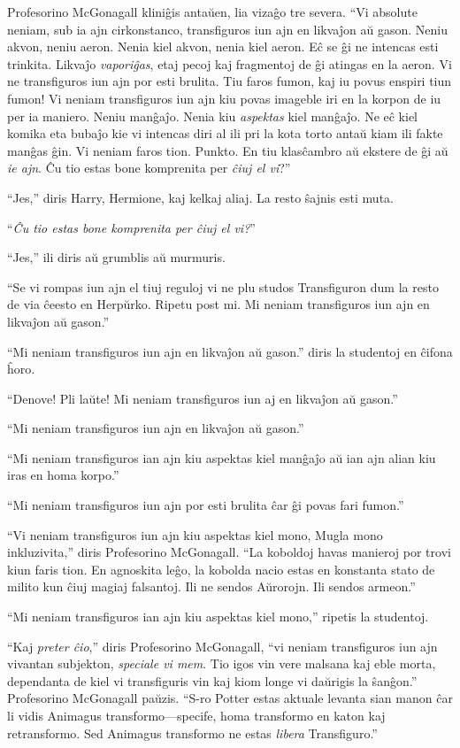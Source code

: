 Profesorino McGonagall kliniĝis antaŭen, lia vizaĝo tre severa. ``Vi
absolute neniam, sub ia ajn cirkonstanco, transfiguros iun ajn en
likvaĵon aŭ gason. Neniu akvon, neniu aeron. Nenia kiel akvon, nenia
kiel aeron. Eĉ se ĝi ne intencas esti trinkita. Likvaĵo
\emph{vaporiĝas}, etaj pecoj kaj fragmentoj de ĝi atingas en la
aeron. Vi ne transfiguros iun ajn por esti brulita. Tiu faros fumon,
kaj iu povus enspiri tiun fumon! Vi neniam transfiguros iun ajn kiu
povas imageble iri en la korpon de iu per ia maniero. Neniu
manĝaĵo. Nenia kiu \emph{aspektas} kiel manĝaĵo. Ne eĉ kiel komika eta
bubaĵo kie vi intencas diri al ili pri la kota torto antaŭ kiam ili
fakte manĝas ĝin. Vi neniam faros tion. Punkto. En tiu klasĉambro aŭ
ekstere de ĝi aŭ \emph{ie ajn}. Ĉu tio estas bone komprenita per
\emph{ĉiuj el vi}?''

``Jes,'' diris Harry, Hermione, kaj kelkaj aliaj. La resto ŝajnis esti
muta.

``\emph{Ĉu tio estas bone komprenita per ĉiuj el vi?}''

``Jes,'' ili diris aŭ grumblis aŭ murmuris.

``Se vi rompas iun ajn el tiuj reguloj vi ne plu studos Transfiguron
dum la resto de via ĉeesto en Herpŭrko. Ripetu post mi. Mi neniam
transfiguros iun ajn en likvaĵon aŭ gason.''

``Mi neniam transfiguros iun ajn en likvaĵon aŭ gason.'' diris la studentoj en ĉifona ĥoro.

``Denove! Pli laŭte! Mi neniam transfiguros iun aj en likvaĵon aŭ gason.''

``Mi neniam transfiguros iun ajn en likvaĵon aŭ gason.''

``Mi neniam transfiguros ian ajn kiu aspektas kiel manĝaĵo aŭ ian ajn
alian kiu iras en homa korpo.''

``Mi neniam transfiguros iun ajn por esti brulita ĉar ĝi povas fari fumon.''

``Vi neniam transfiguros iun ajn kiu aspektas kiel mono, Mugla mono
inkluzivita,'' diris Profesorino McGonagall. ``La koboldoj havas
manieroj por trovi kiun faris tion. En agnoskita leĝo, la kobolda nacio
estas en konstanta stato de milito kun ĉiuj magiaj falsantoj. Ili ne
sendos Aŭrorojn. Ili sendos armeon.''

``Mi neniam transfiguros ian ajn kiu aspektas kiel mono,'' ripetis la studentoj.

``Kaj \emph{preter ĉio},'' diris Profesorino McGonagall, ``vi neniam
transfiguros iun ajn vivantan subjekton, \emph{speciale vi mem}. Tio
igos vin vere malsana kaj eble morta, dependanta de kiel vi
transfiguris vin kaj kiom longe vi daŭrigis la ŝanĝon.'' Profesorino
McGonagall paŭzis. ``S-ro Potter estas aktuale levanta sian manon ĉar
li vidis Animagus transformo—specife, homa transformo en katon kaj
retransformo. Sed Animagus transformo ne estas \emph{libera}
Transfiguro.''

